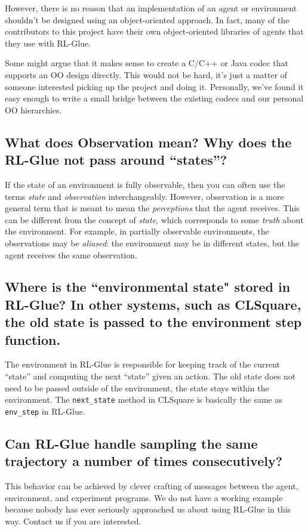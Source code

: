 \documentclass[11pt]{article}
\begin{document}
However, there is no reason that an implementation of an agent or environment shouldn't be designed using an object-oriented 
approach.  In fact, many of the contributors to this project have their own object-oriented libraries of agents that 
they use with RL-Glue.

Some might argue that it makes sense to create a C/C++ or Java codec that supports an OO design
directly.  This would not be hard, it's just a matter of someone interested picking up the project and doing it.  Personally, 
we've found it easy enough to write a small bridge between the existing codecs and our personal OO hierarchies.

\subsection{What does Observation mean? Why does the RL-Glue not pass around ``states''?}
If the state of an environment is fully observable, then you can often use the terms \textit{state} and \textit{observation} interchangeably. However, 
observation is a more  general term that is meant to mean the \textit{perceptions} that the agent receives.  This can be different 
from the concept of \textit{state}, which corresponds to some \textit{truth} about the environment.  For example, in partially observable environments, the observations
may be \textit{aliased}: the environment may be in different states, but the agent receives the same observation. 


\subsection{Where is the ``environmental state" stored in RL-Glue? In other systems, such as CLSquare, the old state is passed to the environment step function.}
The environment in RL-Glue is responsible for keeping  track of the current ``state'' and computing the next ``state'' given an action. The old state does not need to be passed
outside of the environment, the state stays within the  environment. The \texttt{next\_state} method in CLSquare is basically the same as \texttt{env\_step} in RL-Glue.


\subsection{Can RL-Glue handle sampling the same trajectory a number of times consecutively?}
This behavior can be achieved by clever crafting of messages between the agent, environment, and experiment programs.  We do not have a working example because nobody has ever seriously approached us about using RL-Glue in this way.  Contact us if you are interested.
\end{document}
